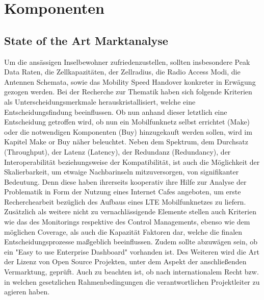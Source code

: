 
%
%
% 
% 
% 


\section{Komponenten}
\label{sec:Komponenten}

\subsection{State of the Art Marktanalyse}
\label{subsec:Marktanalyse}

Um die ansässigen Inselbewohner zufriedenzustellen, sollten insbesondere Peak Data Raten, die Zellkapazitäten, der Zellradius, die Radio Access Modi, die Antennen Schemata, sowie das Mobility Speed Handover konkreter in Erwägung gezogen werden\cite{Dat14}.
Bei der Recherche zur Thematik haben sich folgende Kriterien als Unterscheidungsmerkmale herauskristallisiert, welche eine Entscheidungsfindung beeinflussen. Ob nun anhand dieser letztlich eine Entscheidung getroffen wird, ob nun ein Mobilfunknetz selbst errichtet (Make) oder die notwendigen Komponenten (Buy) hinzugekauft werden sollen, wird im Kapitel Make or Buy näher beleuchtet. Neben dem Spektrum, dem Durchsatz (Throughput), der Latenz (Latency), der Redundanz (Redundancy), der Interoperabilität beziehungsweise der Kompatibilität, ist auch die Möglichkeit der Skalierbarkeit, um etwaige Nachbarinseln mitzuversorgen, von signifikanter Bedeutung. Denn diese haben ihrerseits kooperativ ihre Hilfe zur Analyse der Problematik in Form der Nutzung eines Internet Cafes angeboten, um erste Recherchearbeit bezüglich des Aufbaus eines LTE Mobilfunknetzes zu liefern. Zusätzlich  als weitere nicht zu vernachlässigende Elemente stellen auch Kriterien wie das des Monitorings respektive des Control Managements, ebenso wie dem möglichen Coverage, als auch die Kapazität Faktoren dar, welche die finalen Entscheidungsprozesse maßgeblich beeinflussen. Zudem sollte abzuwägen sein, ob ein "Easy to use Enterprise Dashboard" vorhanden ist. Des Weiteren wird die Art der Lizenz von Open Source Projekten, unter dem Aspekt der anschließenden Vermarktung, geprüft. Auch zu beachten ist, ob nach internationalem Recht bzw. in welchen gesetzlichen Rahmenbedingungen die verantwortlichen Projektleiter zu agieren haben.

